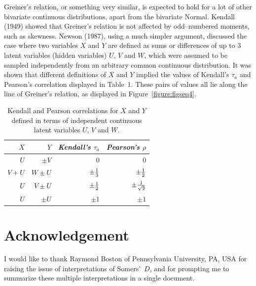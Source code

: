 \documentclass[a4paper,notitlepage]{article}      %
\begin{document}
Greiner's relation, or something very similar,
is expected to hold for a lot of other bivariate continuous distributions, apart from the bivariate Normal.
Kendall (1949)\cite{kendall1949} showed that Greiner's relation is not affected by odd--numbered moments,
such as skewness.
Newson (1987)\cite{newson1987}, using a much simpler argument,
discussed the case where two variables $X$ and $Y$ are defined as sums or differences of up to 3 latent variables
(hidden variables) $U$, $V$ and $W$,
which were assumed to be sampled independently from an arbitrary common continuous distribution.
It was shown that different definitions of $X$ and $Y$ implied the values of Kendall's $\tau_a$
and Pearson's correlation displayed in Table~1.
These pairs of values all lie along the line of Greiner's relation,
as displayed in Figure~\ref{figure:figseq4}.

\medskip

\begin{table}[h]\label{table:greiner1}
\begin{center}
\caption{Kendall and Pearson correlations for $X$ and $Y$ defined in terms of independent continuous latent variables $U$, $V$ and $W$.}
\begin{tabular}{rrrr} \hline
$X$&$Y$&\textit{Kendall's $\tau_a$}&\textit{Pearson's $\rho$}\\ \hline
$U$&$\pm V$&0&0\\
$V+U$&$W\pm U$&$\pm {1\over 3}$&$\pm {1\over 2}$\\
$U$&$V\pm U$&$\pm {1\over 2}$&$\pm {1\over \sqrt 2}$\\
$U$&$\pm U$&$\pm 1$&$\pm 1$\\
\hline
\end{tabular}
\end{center}
\end{table}

\section{Acknowledgement}

I would like to thank Raymond Boston of Pennsylvania University, PA, USA for raising the issue of interpretations of Somers'~$D$,
and for prompting me to summarize these multiple interpretations in a single document.

\medskip

\end{document}
